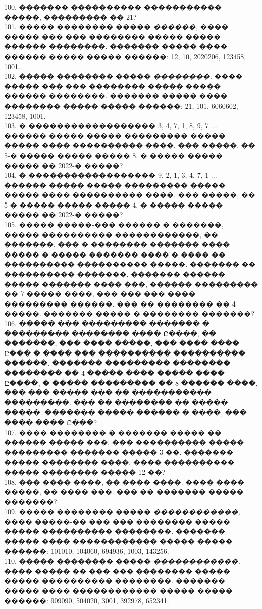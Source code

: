 \documentclass[12pt]{article}
\begin{document}
100. ������� ���������� ����������� �����, ��������� �� 21?\\
101. ����� �������� ����� {\it ������,} ���� ����� ��� ��� �������� ����� ����� ������ ��������. ������� ����� ���� ������ ����� ����� ������: 12, 10, 2020206, 123458, 1001.\\
102. ����� �������� ����� {\it ��������,} ���� ����� ��� ��� �������� ����� ����� ������ ��������. ������� ����� ���� �������� ����� ����� ������: 21, 101, 6060602, 123458, 1001.\\
103. � ������������������ 3, 4, 7, 1, 8, 9, 7 ... ������ ����� ����� ��������� ����� ����� ���� ���������� ����. ��� �����, �� 5-� ����� ����� ����� 8. � ����� ����� ����� �� 2022-� �����?\\
104. � ������������������ 9, 2, 1, 3, 4, 7, 1 ... ������ ����� ����� ��������� ����� ����� ���� ���������� ����. ��� �����, �� 5-� ����� ����� ����� 4. � ����� ����� ����� �� 2022-� �����?\\
105. ����� �����-��� ������ � �������, ����� ���������� ������������, �� �������, ��� � �������� ������� ���� ����� � ����� ������� ���� � ���� �� ���������� ���������� �����. ������� �� ���������� �������, ������� ������ ����� ������� ���� ���, ������ ��������� �� 7 ����� ����, ��� ��� ��� ���� ��������� ������. ��� �� �������� �� 4 �����. ������� ����� � �������� �������?\\
106. ����� ��� ��������� ������� � ��������� �������� ���� Ը����, �� �������, ��� ���� �����, ��� ���� ���� Ը��� � ���� ��� ���������� ���������� ������. ������� ��������� �������� �������� �� 4 ����� ���� ����� ���� Ը����, � ����� ��������� �� 8 ������ ����, ��� ��� ����� ��� �� ����������� ���������. ��� �� �������� �� ����� �����. ������� ����� ������ � ����, ��� ���� ���� Ը���?\\
107. ���� �������� � ������� ����� �� ������ ����� ���, ��� ���������� ����� ��������� ������� ����� 3 ��. ������� ����� �������� ����, ���� ���������� ����� �������� ����� 12 ��?\\
108. ��� ���� ����, �� ���� ����. ���� ���� �����, �� ���� ���. ��� �� ������� ����� �������?\\
109. ����� �������� ����� {\it ������������,} ���� �����-�� ��� ��� �������� ����� ����� ���������� ��������. ������� ����� ���� ������������ ����� ����� ������: 101010, 104060, 694936, 1003, 143256.\\
110. ����� �������� ����� {\it ������������,} ���� �����-�� ��� ��� �������� ����� ����� ���������� ��������. ������� ����� ���� ������������ ����� ����� ������: 909090, 504020, 3001, 392978, 652341.\\
\end{document}
